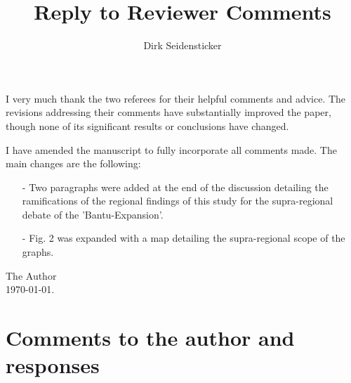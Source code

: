 

\usepackage[hidelinks]{hyperref}
\usepackage{natbib}

\usepackage{booktabs}
\usepackage{subcaption}

\renewcommand{\thefigure}{R\arabic{figure}}
\renewcommand{\thetable}{R\arabic{table}}

\title{Reply to Reviewer Comments}
\author{Dirk Seidensticker}


\maketitle

\noindent I very much thank the two referees for their helpful comments and advice. The revisions addressing their comments have substantially improved the paper, though none of its significant results or conclusions have changed.

I have amended the manuscript to fully incorporate all comments made. The main changes are the following:


\begin{itemize}
	\item [-] Two paragraphs were added at the end of the discussion detailing the ramifications of the regional findings of this study for the supra-regional debate of the 'Bantu-Expansion'.
	\item [-] Fig. 2 was expanded with a map detailing the supra-regional scope of the graphs.
\end{itemize}

\noindent The Author\\

\noindent \today.

{\centering \section*{Comments to the author and responses}}

